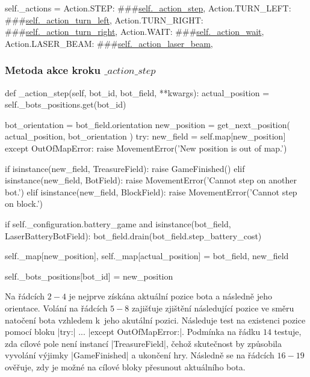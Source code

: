 \begin{code}[caption={Slovník akcí ve třídě $Game$},label={lst:game-actions},aboveskip=-10pt]
self._actions = {
    Action.STEP: ###\hyperref[subsubsec:method-action-step]{self.\_action\_step},
    Action.TURN_LEFT: ###\hyperref[subsubsec:method-action-turn-left]{self.\_action\_turn\_left},
    Action.TURN_RIGHT: ###\hyperref[subsubsec:method-action-turn-right]{self.\_action\_turn\_right},
    Action.WAIT: ###\hyperref[subsubsec:method-action-wait]{self.\_action\_wait},
    Action.LASER_BEAM: ###\hyperref[subsubsec:method-action-laser-beam]{self.\_action\_laser\_beam},
}	
\end{code}
{ %


\subsubsection{Metoda akce kroku $\_action\_step$}
\label{subsubsec:method-action-step}
\begin{code}[caption={Metoda $Game.\_action\_step$},label={lst:game-action-step}]
def _action_step(self, bot_id, bot_field, **kwargs):
    actual_position = self._bots_positions.get(bot_id)

    bot_orientation = bot_field.orientation
    new_position = get_next_position(
        actual_position,
        bot_orientation
    )
    try:
        new_field = self.map[new_position]
    except OutOfMapError:
        raise MovementError('New position is out of map.')

    if isinstance(new_field, TreasureField):
        raise GameFinished()
    elif isinstance(new_field, BotField):
        raise MovementError('Cannot step on another bot.')
    elif isinstance(new_field, BlockField):
        raise MovementError('Cannot step on block.')

    if self._configuration.battery_game and isinstance(bot_field, LaserBatteryBotField):
        bot_field.drain(bot_field.step_battery_cost)

    self._map[new_position], self._map[actual_position] = bot_field, new_field

    self._bots_positions[bot_id] = new_position
\end{code}

Na řádcích $2-4$ je nejprve získána aktuální pozice bota a následně jeho orientace. Volání na řádcích $5-8$ zajišťuje zjištění následující pozice ve směru natočení bota vzhledem k~jeho akutální pozici. Následuje test na existenci pozice pomocí bloku \ic|try:| $...$ \ic|except OutOfMapError:|. Podmínka na řádku $14$ testuje, zda cílové pole není instancí \ic|TreasureField|, čehož skutečnost by způsobila vyvolání výjimky \ic|GameFinished| a ukončení hry. Následně se na řádcích $16-19$ ověřuje, zdy je možné na cílové bloky přesunout aktuálního bota.

}
